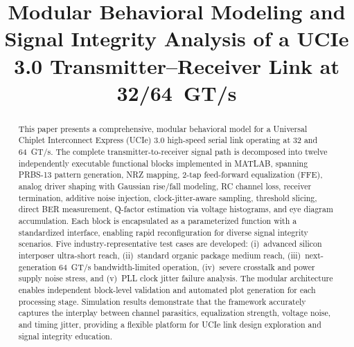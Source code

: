 \documentclass[conference]{IEEEtran}
\begin{document}
\title{Modular Behavioral Modeling and Signal Integrity Analysis of a UCIe 3.0 Transmitter--Receiver Link at 32/64~GT/s}

\author{
\and
{}
}

\maketitle

\begin{abstract}
This paper presents a comprehensive, modular behavioral model for a Universal Chiplet Interconnect Express (UCIe) 3.0 high-speed serial link operating at 32 and 64~GT/s. The complete transmitter-to-receiver signal path is decomposed into twelve independently executable functional blocks implemented in MATLAB, spanning PRBS-13 pattern generation, NRZ mapping, 2-tap feed-forward equalization (FFE), analog driver shaping with Gaussian rise/fall modeling, RC channel loss, receiver termination, additive noise injection, clock-jitter-aware sampling, threshold slicing, direct BER measurement, Q-factor estimation via voltage histograms, and eye diagram accumulation. Each block is encapsulated as a parameterized function with a standardized interface, enabling rapid reconfiguration for diverse signal integrity scenarios. Five industry-representative test cases are developed: (i)~advanced silicon interposer ultra-short reach, (ii)~standard organic package medium reach, (iii)~next-generation 64~GT/s bandwidth-limited operation, (iv)~severe crosstalk and power supply noise stress, and (v)~PLL clock jitter failure analysis. The modular architecture enables independent block-level validation and automated plot generation for each processing stage. Simulation results demonstrate that the framework accurately captures the interplay between channel parasitics, equalization strength, voltage noise, and timing jitter, providing a flexible platform for UCIe link design exploration and signal integrity education.
\end{abstract}
\end{document}
